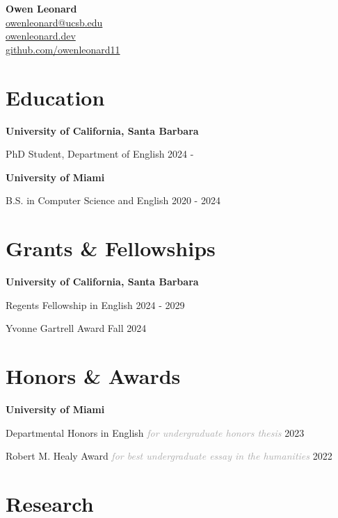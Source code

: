 \documentclass[a4paper,10pt]{article}
\begin{document}
{\LARGE \textbf{Owen Leonard}} \\[0.2cm]
\noindent
\faEnvelope \hspace{0.2cm} \href{mailto:owenleonard@ucsb.edu}{owenleonard@ucsb.edu} \\
\faLink \hspace{0.2cm} \href{https://owenleonard.dev/}{owenleonard.dev} \\
\faGithub \hspace{0.2cm} \href{https://github.com/owenleonard11}{github.com/owenleonard11}

\section*{Education}

\textbf{University of California, Santa Barbara} \hfill  

PhD Student, Department of English \hfill 2024 - 

\textbf{University of Miami} \hfill  

B.S. in Computer Science and English \hfill 2020 - 2024 


\section*{Grants \& Fellowships}

\textbf{University of California, Santa Barbara} \hfill  

Regents Fellowship in English \hfill 2024 - 2029 

Yvonne Gartrell Award \hfill Fall 2024 


\section*{Honors \& Awards}

\textbf{University of Miami} \hfill  

Departmental Honors in English \hspace{0.2cm} \textcolor{darkgray}{\textit{for undergraduate honors thesis}} \hfill 2023 

Robert M. Healy Award \hspace{0.2cm} \textcolor{darkgray}{\textit{for best undergraduate essay in the humanities}} \hfill 2022 


\section*{Research}
\end{document}
